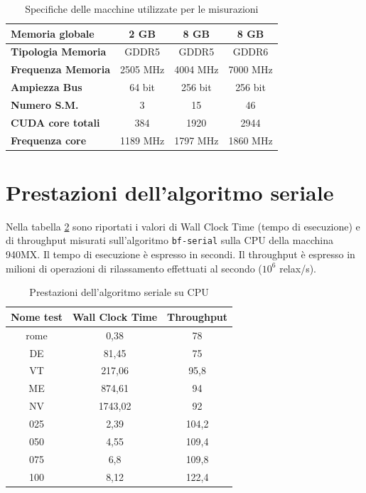 \documentclass[12pt,a4paper]{book}
\begin{document}
\begin{table}[!ht]
{\begin{tabular}{|l|c|c|c|}
				\textbf{Memoria globale} & 2 GB & 8 GB & 8 GB \\ \hline
				\textbf{Tipologia Memoria} & GDDR5 & GDDR5 & GDDR6 \\ \hline
				\textbf{Frequenza Memoria} & 2505 MHz & 4004 MHz & 7000 MHz \\ \hline
				\textbf{Ampiezza Bus} & 64 bit & 256 bit & 256 bit \\ \hline
				\textbf{Numero S.M.} & 3 & 15 & 46 \\ \hline
				\textbf{CUDA core totali} & 384 & 1920 & 2944 \\ \hline
				\textbf{Frequenza core} & 1189 MHz & 1797 MHz & 1860 MHz \\ \hline
			\end{tabular}
		}
		\caption{Specifiche delle macchine utilizzate per le misurazioni}
		\label{tab:specs}
	\end{table}

	\section{Prestazioni dell'algoritmo seriale}
	Nella tabella \ref{tab:performance_serial} sono riportati i valori di Wall Clock Time (tempo di esecuzione) e di throughput misurati sull'algoritmo \texttt{bf-serial} sulla CPU della macchina 940MX. Il tempo di esecuzione è espresso in secondi. Il throughput è espresso in milioni di operazioni di rilassamento effettuati al secondo ($10^6$ relax/s).
	
	\begin{table}[!ht]
		\centering
		\begin{tabular}{|c|c|c|}
			\hline
			\textbf{Nome test} & \textbf{Wall Clock Time} & \textbf{Throughput} \\ \hline
			       rome & 0,38 & 78 \\ \hline
			        DE & 81,45 & 75 \\ \hline
			        VT & 217,06 & 95,8 \\ \hline
			        ME & 874,61 & 94 \\ \hline
			        NV & 1743,02 & 92 \\ \hline
			        025 & 2,39 & 104,2 \\ \hline
			        050 & 4,55 & 109,4 \\ \hline
			        075 & 6,8 & 109,8 \\ \hline
			        100 & 8,12 & 122,4 \\ \hline
		\end{tabular}
		\caption{Prestazioni dell'algoritmo seriale su CPU}
		\label{tab:performance_serial}
	\end{table}
\end{document}
